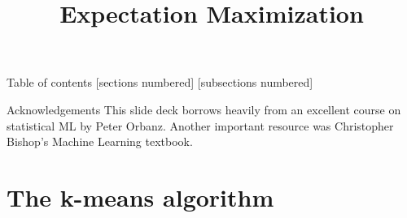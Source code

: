 \documentclass[10pt]{beamer}
\title{Expectation Maximization}
\begin{document}
\maketitle
\begin{frame}{Table of contents}
  [sections numbered]
  [subsections numbered]
  \tableofcontents
\end{frame}

\begin{frame}{Acknowledgements}
This slide deck borrows heavily from an excellent course on statistical ML by Peter Orbanz.  
\vfill
Another important resource was Christopher Bishop's Machine Learning textbook.
\end{frame}

\section{The k-means algorithm}
\end{document}
